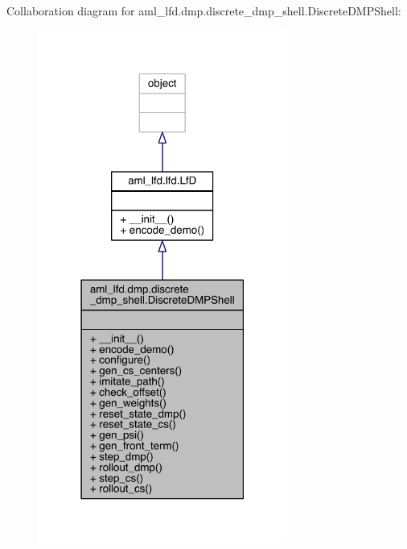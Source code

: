 Collaboration diagram for aml\+\_\+lfd.\+dmp.\+discrete\+\_\+dmp\+\_\+shell.\+Discrete\+D\+M\+P\+Shell\+:\nopagebreak
\begin{figure}[H]
\begin{center}
\leavevmode
\includegraphics[width=231pt]{classaml__lfd_1_1dmp_1_1discrete__dmp__shell_1_1_discrete_d_m_p_shell__coll__graph}
\end{center}
\end{figure}
